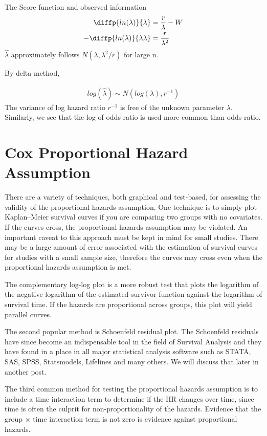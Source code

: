 \documentclass[11pt]{article} %
\begin{document}
The Score function and observed information
\begin{align*}
	\diffp{ln(\lambda)}{\lambda} & = \frac{r}{\lambda} -W\\
	-\diffp{ln(\lambda)}{{\lambda}{\lambda}} &= \frac{r}{\lambda^2}
\end{align*}
$\hat\lambda$ approximately follows $N(\lambda, \lambda^2/r)$ for large n.

By delta method,

\begin{align*}
	log(\hat\lambda) \sim N(log(\lambda), r^{-1})
\end{align*}
The variance of log hazard ratio $r^{-1}$ is free of the unknown parameter $\lambda$. Similarly, we see that the log of odds ratio is used more common than odds ratio. 


\section{Cox Proportional Hazard Assumption}

There are a variety of techniques, both graphical and test-based, for assessing the validity of the proportional hazards assumption. One technique is to simply plot Kaplan–Meier survival curves if you are comparing two groups with no covariates. If the curves cross, the proportional hazards assumption may be violated. An important caveat to this approach must be kept in mind for small studies. There may be a large amount of error associated with the estimation of survival curves for studies with a small sample size, therefore the curves may cross even when the proportional hazards assumption is met. 

The complementary log-log plot is a more robust test that plots the logarithm of the negative logarithm of the estimated survivor function against the logarithm of survival time. If the hazards are proportional across groups, this plot will yield parallel curves. 

The second popular method is Schoenfeld residual plot. The Schoenfeld residuals have since become an indispensable tool in the field of Survival Analysis and they have found in a place in all major statistical analysis software such as STATA, SAS, SPSS, Statsmodels, Lifelines and many others. We will discuss that later in another post.

The third common method for testing the proportional hazards assumption is to include a time interaction term to determine if the HR changes over time, since time is often the culprit for non-proportionality of the hazards. Evidence that the group $\times$ time interaction term is not zero is evidence against proportional hazards.
\end{document}
